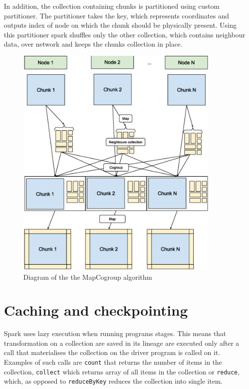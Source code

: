 \documentclass{l4proj}
\begin{document}
In addition, the collection containing chunks is partitioned using custom partitioner.
The partitioner takes the key, which represents coordinates and outputs index of node
on which the chunk should be physically present. Using this partitioner spark
shuffles only the other collection, which contains neighbour data, over network and
keeps the chunks collection in place.

\begin{figure}
\centering
\includegraphics[width=0.9\textwidth]{images/MapCogroup.eps}
\caption{Diagram of the the MapCogroup algorithm}
\label{fig:map_cogroup}
\end{figure}

\section{Caching and checkpointing}

Spark uses lazy execution when running programs stages. This means that transformation
on a collection are saved in its lineage are executed only after a call
that materialises the collection on the driver program is called on it. Examples of such calls are
\texttt{count} that returns the number of items in the collection, \texttt{collect}
which returns array of all items in the collection or \texttt{reduce}, which, as opposed
to \texttt{reduceByKey} reduces the collection into single item.
\end{document}
